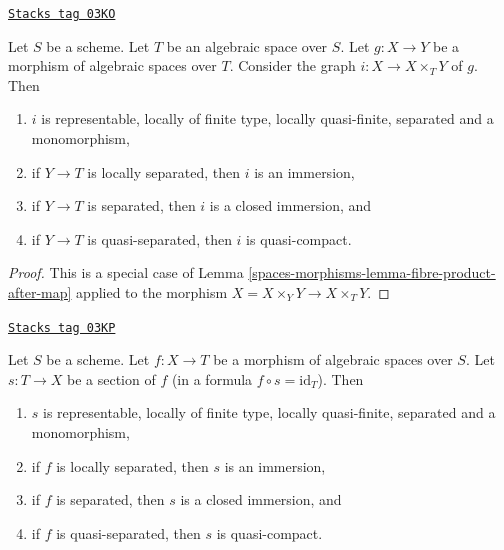 \begin{lemma}
\label{spaces-morphisms-lemma-semi-diagonal}
\href{https://stacks.math.columbia.edu/tag/03KO}{\texttt{Stacks tag 03KO}}


Let $S$ be a scheme. Let $T$ be an algebraic space over $S$.
Let $g : X \to Y$ be a morphism of algebraic spaces over $T$.
Consider the graph $i : X \to X \times_T Y$ of $g$. Then
\begin{enumerate}
\item $i$ is representable, locally of finite type, locally quasi-finite,
separated and a monomorphism,
\item if $Y \to T$ is locally separated, then $i$ is an immersion,
\item if $Y \to T$ is separated, then $i$ is a closed immersion, and
\item if $Y \to T$ is quasi-separated, then $i$ is quasi-compact.
\end{enumerate}
\end{lemma}

\begin{proof}
This is a special case of Lemma \ref{spaces-morphisms-lemma-fibre-product-after-map}
applied to the morphism $X = X \times_Y Y \to X \times_T Y$.
\end{proof}

\begin{lemma}
\label{spaces-morphisms-lemma-section-immersion}
\href{https://stacks.math.columbia.edu/tag/03KP}{\texttt{Stacks tag 03KP}}

Let $S$ be a scheme.
Let $f : X \to T$ be a morphism of algebraic spaces over $S$.
Let $s : T \to X$ be a section of $f$ (in a formula
$f \circ s = \text{id}_T$). Then
\begin{enumerate}
\item $s$ is representable, locally of finite type, locally quasi-finite,
separated and a monomorphism,
\item if $f$ is locally separated, then $s$ is an immersion,
\item if $f$ is separated, then $s$ is a closed immersion, and
\item if $f$ is quasi-separated, then $s$ is quasi-compact.
\end{enumerate}
\end{lemma}

